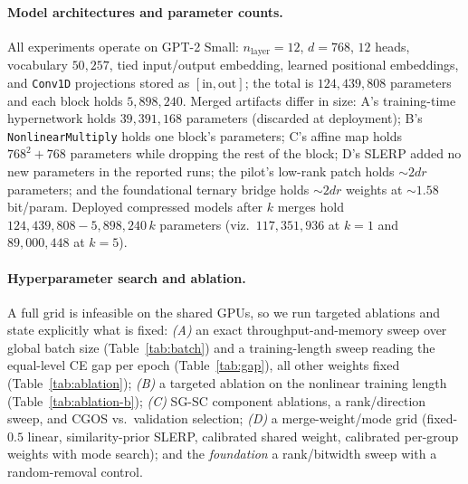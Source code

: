 \documentclass[10pt,a4paper]{article}
\newcommand{\nlop}{\texttt{NonlinearMultiply}}
\begin{document}
\paragraph{Model architectures and parameter counts.} All experiments operate on
GPT-2 Small: $n_\text{layer}=12$, $d=768$, $12$ heads, vocabulary $50{,}257$,
tied input/output embedding, learned positional embeddings, and \texttt{Conv1D}
projections stored as $[\text{in},\text{out}]$; the total is $124{,}439{,}808$
parameters and each block holds $5{,}898{,}240$. Merged artifacts differ in
size: A's training-time hypernetwork holds $39{,}391{,}168$ parameters (discarded
at deployment); B's \nlop{} holds one block's parameters; C's affine map holds
$768^2+768$ parameters while dropping the rest of the block; D's SLERP added no
new parameters in the reported runs; the pilot's low-rank patch holds
${\sim}2dr$ parameters; and the foundational ternary bridge holds ${\sim}2dr$
weights at ${\sim}1.58$ bit/param. Deployed compressed models after $k$ merges
hold $124{,}439{,}808-5{,}898{,}240\,k$ parameters (viz.\ $117{,}351{,}936$ at
$k=1$ and $89{,}000{,}448$ at $k=5$).

\paragraph{Hyperparameter search and ablation.} A full grid is infeasible on the
shared GPUs, so we run targeted ablations and state explicitly what is fixed:
\emph{(A)} an exact throughput-and-memory sweep over global batch size
(Table~\ref{tab:batch}) and a training-length sweep reading the equal-level CE
gap per epoch (Table~\ref{tab:gap}), all other weights fixed
(Table~\ref{tab:ablation}); \emph{(B)} a targeted ablation on the nonlinear
training length (Table~\ref{tab:ablation-b}); \emph{(C)} SG-SC component
ablations, a rank/direction sweep, and CGOS vs.\ validation selection;
\emph{(D)} a merge-weight/mode grid (fixed-$0.5$ linear, similarity-prior SLERP,
calibrated shared weight, calibrated per-group weights with mode search); and
the \emph{foundation} a rank/bitwidth sweep with a random-removal control.
\end{document}
